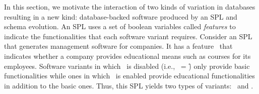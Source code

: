 



In this section, we motivate the interaction of two kinds of variation in databases 
resulting in a new kind:
database-backed software produced by an SPL and schema evolution.
An SPL uses a set of boolean variables called \emph{features} 
to indicate the functionalities that each software variant requires.
Consider an SPL that generates management software for companies. 
It has a feature \edu\ that 
indicates whether a company
provides educational means such as courses for its 
employees.
Software variants in which \edu\ is disabled (i.e., \edu\ = \f) only provide basic 
functionalities while ones in which \edu\ is enabled provide educational functionalities
in addition to the basic ones. Thus, this SPL yields two types of variants:
\basic\ and \educational.

